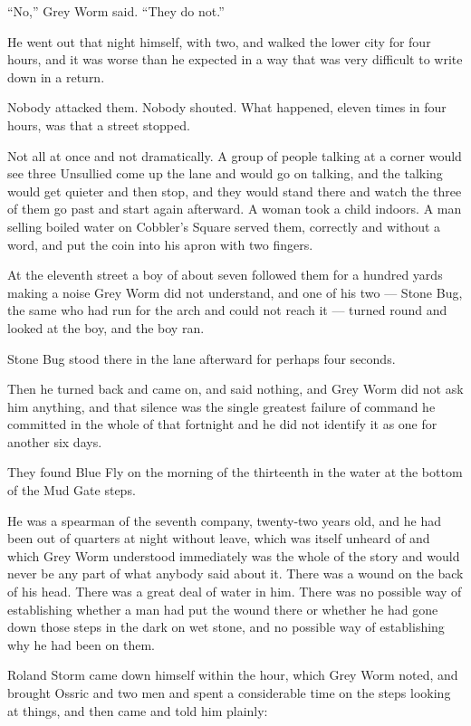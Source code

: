 “No,” Grey Worm said. “They do not.”

\sceneBreak

He went out that night himself, with two, and walked the lower city for four hours, and it was worse than he expected in a way that was very difficult to write down in a return.

Nobody attacked them. Nobody shouted. What happened, eleven times in four hours, was that a street stopped.

Not all at once and not dramatically. A group of people talking at a corner would see three Unsullied come up the lane and would go on talking, and the talking would get quieter and then stop, and they would stand there and watch the three of them go past and start again afterward. A woman took a child indoors. A man selling boiled water on Cobbler’s Square served them, correctly and without a word, and put the coin into his apron with two fingers.

At the eleventh street a boy of about seven followed them for a hundred yards making a noise Grey Worm did not understand, and one of his two — Stone Bug, the same who had run for the arch and could not reach it — turned round and looked at the boy, and the boy ran.

Stone Bug stood there in the lane afterward for perhaps four seconds.

Then he turned back and came on, and said nothing, and Grey Worm did not ask him anything, and that silence was the single greatest failure of command he committed in the whole of that fortnight and he did not identify it as one for another six days.

\sceneBreak

They found Blue Fly on the morning of the thirteenth in the water at the bottom of the Mud Gate steps.

He was a spearman of the seventh company, twenty-two years old, and he had been out of quarters at night without leave, which was itself unheard of and which Grey Worm understood immediately was the whole of the story and would never be any part of what anybody said about it. There was a wound on the back of his head. There was a great deal of water in him. There was no possible way of establishing whether a man had put the wound there or whether he had gone down those steps in the dark on wet stone, and no possible way of establishing why he had been on them.

Roland Storm came down himself within the hour, which Grey Worm noted, and brought Ossric and two men and spent a considerable time on the steps looking at things, and then came and told him plainly:

